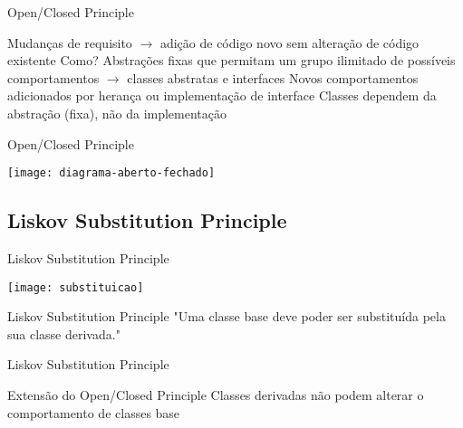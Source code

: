 \documentclass{beamer}
\begin{document}
\begin{frame}{Open/Closed Principle}
 \begin{outline}
  \1 
   Mudanças de requisito $\rightarrow$ adição de código novo sem alteração de código existente
   Como?
     Abstrações fixas que permitam um grupo ilimitado de possíveis comportamentos $\rightarrow$ classes abstratas e interfaces
     Novos comportamentos adicionados por herança ou implementação de interface
     Classes dependem da abstração (fixa), não da implementação
 \end{outline}
\end{frame}

\begin{frame}{Open/Closed Principle}
  \begin{center}
    \texttt{[image: diagrama-aberto-fechado]}
  \end{center}
\end{frame}

\subsection{Liskov Substitution Principle}

\begin{frame}{Liskov Substitution Principle}
  \begin{center}
    \texttt{[image: substituicao]}
  \end{center}
\end{frame}

\begin{frame}{Liskov Substitution Principle}
 "Uma classe base deve poder ser substituída pela sua classe derivada."
\end{frame}

\begin{frame}{Liskov Substitution Principle}
 \begin{outline}
   Extensão do Open/Closed Principle
   Classes derivadas não podem alterar o comportamento de classes base
 \end{outline}
\end{frame}
\end{document}
